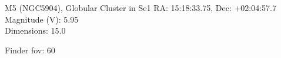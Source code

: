 \begin{block}{M5 (NGC5904), Globular Cluster in Se1}
    RA: 15:18:33.75, Dec: +02:04:57.7 \\ 
    Magnitude (V): 5.95 \\ 
    Dimensions: 15.0 

    Finder fov: 60 
\end{block}